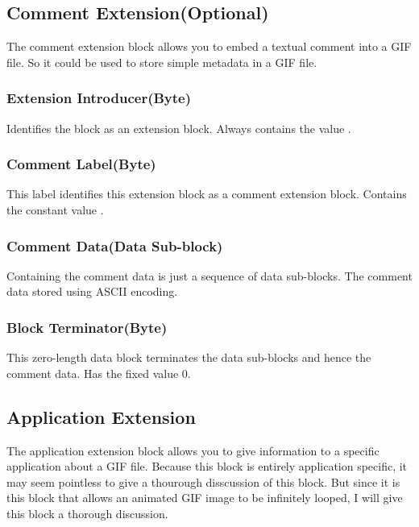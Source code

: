 \subsection{Comment Extension(Optional)}

The comment extension block allows you to embed a textual comment into
a GIF file. So it could be used to store simple metadata in a GIF file.

\subsubsection{Extension Introducer(Byte)}

Identifies the block as an extension block. Always contains the
value .

\subsubsection{Comment Label(Byte)}

This label identifies this extension block as a comment extension
block. Contains the constant value .

\subsubsection{Comment Data(Data Sub-block)}

Containing the comment data is just a sequence of data sub-blocks. The
comment data stored using ASCII encoding.

\subsubsection{Block Terminator(Byte)}

This zero-length data block terminates the data sub-blocks and hence
the comment data. Has the fixed value $0$.

\subsection{Application Extension}

The application extension block allows you to give information to a
specific application about a GIF file. Because this block is
entirely application specific, it may seem pointless to give a
thourough disscussion of this block. But since it is this block that
allows an animated GIF image to be infinitely looped, I will give this
block a thorough discussion.

